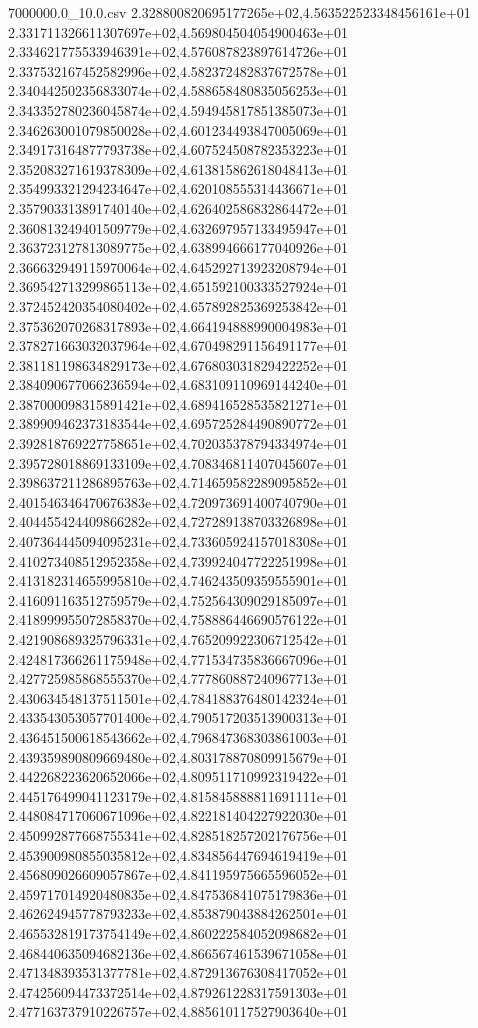 \begin{filecontents*}{7000000.0_10.0.csv}
2.328800820695177265e+02,4.563522523348456161e+01
2.331711326611307697e+02,4.569804504054900463e+01
2.334621775533946391e+02,4.576087823897614726e+01
2.337532167452582996e+02,4.582372482837672578e+01
2.340442502356833074e+02,4.588658480835056253e+01
2.343352780236045874e+02,4.594945817851385073e+01
2.346263001079850028e+02,4.601234493847005069e+01
2.349173164877793738e+02,4.607524508782353223e+01
2.352083271619378309e+02,4.613815862618048413e+01
2.354993321294234647e+02,4.620108555314436671e+01
2.357903313891740140e+02,4.626402586832864472e+01
2.360813249401509779e+02,4.632697957133495947e+01
2.363723127813089775e+02,4.638994666177040926e+01
2.366632949115970064e+02,4.645292713923208794e+01
2.369542713299865113e+02,4.651592100333527924e+01
2.372452420354080402e+02,4.657892825369253842e+01
2.375362070268317893e+02,4.664194888990004983e+01
2.378271663032037964e+02,4.670498291156491177e+01
2.381181198634829173e+02,4.676803031829422252e+01
2.384090677066236594e+02,4.683109110969144240e+01
2.387000098315891421e+02,4.689416528535821271e+01
2.389909462373183544e+02,4.695725284490890772e+01
2.392818769227758651e+02,4.702035378794334974e+01
2.395728018869133109e+02,4.708346811407045607e+01
2.398637211286895763e+02,4.714659582289095852e+01
2.401546346470676383e+02,4.720973691400740790e+01
2.404455424409866282e+02,4.727289138703326898e+01
2.407364445094095231e+02,4.733605924157018308e+01
2.410273408512952358e+02,4.739924047722251998e+01
2.413182314655995810e+02,4.746243509359555901e+01
2.416091163512759579e+02,4.752564309029185097e+01
2.418999955072858370e+02,4.758886446690576122e+01
2.421908689325796331e+02,4.765209922306712542e+01
2.424817366261175948e+02,4.771534735836667096e+01
2.427725985868555370e+02,4.777860887240967713e+01
2.430634548137511501e+02,4.784188376480142324e+01
2.433543053057701400e+02,4.790517203513900313e+01
2.436451500618543662e+02,4.796847368303861003e+01
2.439359890809669480e+02,4.803178870809915679e+01
2.442268223620652066e+02,4.809511710992319422e+01
2.445176499041123179e+02,4.815845888811691111e+01
2.448084717060671096e+02,4.822181404227922030e+01
2.450992877668755341e+02,4.828518257202176756e+01
2.453900980855035812e+02,4.834856447694619419e+01
2.456809026609057867e+02,4.841195975665596052e+01
2.459717014920480835e+02,4.847536841075179836e+01
2.462624945778793233e+02,4.853879043884262501e+01
2.465532819173754149e+02,4.860222584052098682e+01
2.468440635094682136e+02,4.866567461539671058e+01
2.471348393531377781e+02,4.872913676308417052e+01
2.474256094473372514e+02,4.879261228317591303e+01
2.477163737910226757e+02,4.885610117527903640e+01

\end{filecontents*}

